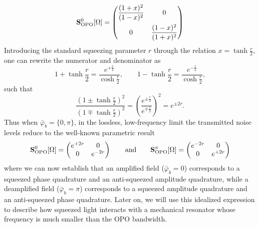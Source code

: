 \begin{equation}
      \mathbf{S}^{0}_{\rm OPO}[\Omega] =\begin{pmatrix}
         \dfrac{(1 + x)^2}{(1 - x)^2} & 0 \\[10pt]
        0 & \dfrac{(1 - x)^2}{(1 + x)^2} 
      \end{pmatrix}
\end{equation}
Introducing the standard squeezing parameter $r$ through the relation $x=\tanh \frac{r}{2}$, one can rewrite the numerator and denominator as
\begin{equation*}
1 + \tanh \frac{r}{2} = \frac{e^{+ \frac{r}{2}}}{\cosh \frac{r}{2}}, 
\qquad
1 - \tanh \frac{r}{2} = \frac{e^{- \frac{r}{2}}}{\cosh \frac{r}{2}},
\end{equation*}
such that
\begin{equation*}
\frac{(1 \pm \tanh \frac{r}{2})^2}{(1 \mp \tanh \frac{r}{2})^2}
= \left(\frac{e^{\pm \frac{r}{2}}}{e^{\mp \frac{r}{2}}}\right)^2
= e^{\pm 2r}.
\end{equation*}
Thus when $\bar\varphi_b=\{0,\pi\}$, in the lossless, low-frequency limit the transmitted noise levels reduce to the well-known parametric result
\begin{equation}
      \mathbf{S}^0_{\rm OPO}[\Omega] =\begin{pmatrix}
         e^{+ 2r} & 0 \\
        0 & e^{- 2r} 
      \end{pmatrix} \quad \quad \text{and} \quad \quad
      \mathbf{S}^\pi_{\rm OPO}[\Omega] =\begin{pmatrix}
         e^{- 2r} & 0 \\
        0 & e^{+ 2r}
      \end{pmatrix}
      \label{eq:perfect_squeezer}
\end{equation}
where we can now establish that an amplified field ($\bar\varphi_b=0$) corresponds to a squeezed phase quadrature and an anti-squeezed amplitude quadrature, while a deamplified field ($\bar\varphi_b=\pi$) corresponds to a squeezed amplitude quadrature and an anti-squeezed phase quadrature. 
Later on, we will use this idealized expression to describe how squeezed light interacts with a mechanical resonator whose frequency is much smaller than the OPO bandwidth. \\

